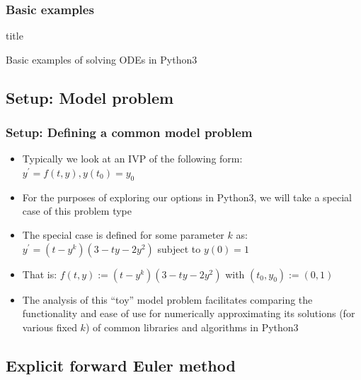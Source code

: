 \documentclass[usenames,svgnames,dvipsnames,10pt]{beamer}
\newcommand{\TitleBoxed}[1]{
     \begin{beamercolorbox}[sep=8pt,center,shadow=true,rounded=true]{title}
          \usebeamerfont{title}#1\vskip 0.6cm\par%
     \end{beamercolorbox}
}
\begin{document}
\begin{frame}
\frametitle{Basic examples} 

\TitleBoxed{
     \Large{\centerline{Basic examples of solving ODEs in Python3}}
}

\end{frame}

\subsection{Setup: Model problem}

\begin{frame}
\frametitle{Setup: Defining a common model problem}

\begin{itemize} 

\item Typically we look at an IVP of the following form: \\ 
      $y^{\prime} = f(t, y), y(t_0) = y_0$
\item For the purposes of exploring our options in Python3, we will take a 
      special case of this problem type
\item The special case is defined for some parameter $k$ as: \\ 
     $y^{\prime} = (t-y^k)(3-ty-2y^2)$ subject to $y(0) = 1$ 
\item That is: $f(t, y) := (t-y^k)(3-ty-2y^2)$ with $(t_0, y_0) := (0, 1)$
\item The analysis of this ``toy'' model problem facilitates comparing the functionality and 
      ease of use for numerically approximating its solutions (for various fixed $k$) 
      of common libraries and algorithms in Python3

\end{itemize} 


\end{frame}

\subsection{Explicit forward Euler method}
\end{document}
